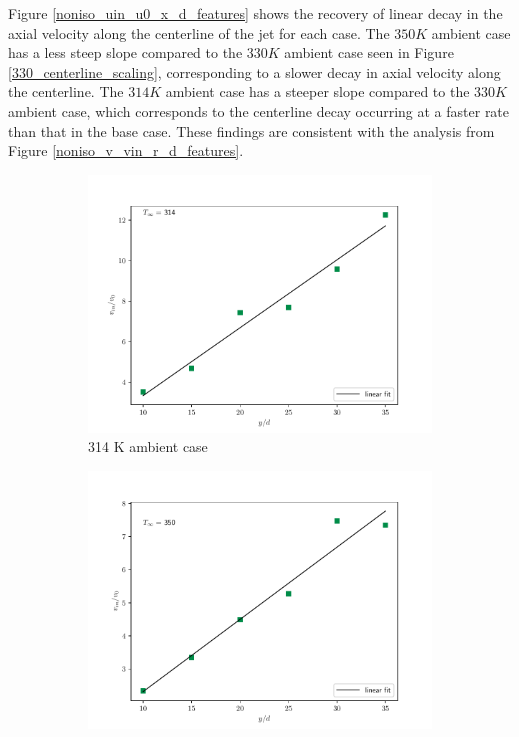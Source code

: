 Figure \ref{noniso_uin_u0_x_d_features} shows the recovery of linear decay in the axial velocity along the centerline of the jet for each case. The $350 K$ ambient case has a less steep slope compared to the $330 K$ ambient case seen in Figure \ref{330_centerline_scaling}, corresponding to a slower decay in axial velocity along the centerline. The $314 K$ ambient case has a steeper slope compared to the $330 K$ ambient case, which corresponds to the centerline decay occurring at a faster rate than that in the base case. These findings are consistent with the analysis from Figure \ref{noniso_v_vin_r_d_features}.
\begin{figure}[H]
\begin{center}
\begin{subfigure}{0.45\textwidth}
	\includegraphics[scale=.45]{figures/Plots/radial/slices_5/314_ambient/uin_u0_vs_x_d.pdf}
	\caption{314 K ambient case} \label{noniso_uin_u0_x_c_1}
\end{subfigure}
\begin{subfigure}{0.45\textwidth}
	\includegraphics[scale=.45]{figures/Plots/radial/slices_5/350_ambient/uin_u0_vs_x_d.pdf}

\end{subfigure}
\end{center}
\end{figure}
